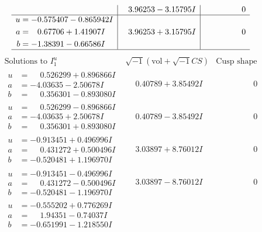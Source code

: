 \documentclass[1p]{elsarticle_modified}
\theoremstyle{definition}
\newcommand{\I}{\sqrt{-1}}
\begin{document}
$$\begin{array}{c|c|c}
 & \phantom{-}3.96253 - 3.15795 I & \phantom{-0.000000 } 0 \\ \hline\begin{aligned}
u &= -0.575407 - 0.865942 I \\
a &= \phantom{-}0.67706 + 1.41907 I \\
b &= -1.38391 - 0.66586 I\end{aligned}
 & \phantom{-}3.96253 + 3.15795 I & \phantom{-0.000000 } 0\\
 \hline 
 \end{array}$$\newpage$$\begin{array}{c|c|c}  
\text{Solutions to }I^u_{1}& \I (\text{vol} + \sqrt{-1}CS) & \text{Cusp shape}\\
 \hline 
\begin{aligned}
u &= \phantom{-}0.526299 + 0.896866 I \\
a &= -4.03635 - 2.50678 I \\
b &= \phantom{-}0.356301 - 0.893080 I\end{aligned}
 & \phantom{-}0.40789 + 3.85492 I & \phantom{-0.000000 } 0 \\ \hline\begin{aligned}
u &= \phantom{-}0.526299 - 0.896866 I \\
a &= -4.03635 + 2.50678 I \\
b &= \phantom{-}0.356301 + 0.893080 I\end{aligned}
 & \phantom{-}0.40789 - 3.85492 I & \phantom{-0.000000 } 0 \\ \hline\begin{aligned}
u &= -0.913451 + 0.496996 I \\
a &= \phantom{-}0.431272 + 0.500496 I \\
b &= -0.520481 + 1.196970 I\end{aligned}
 & \phantom{-}3.03897 + 8.76012 I & \phantom{-0.000000 } 0 \\ \hline\begin{aligned}
u &= -0.913451 - 0.496996 I \\
a &= \phantom{-}0.431272 - 0.500496 I \\
b &= -0.520481 - 1.196970 I\end{aligned}
 & \phantom{-}3.03897 - 8.76012 I & \phantom{-0.000000 } 0 \\ \hline\begin{aligned}
u &= -0.555202 + 0.776269 I \\
a &= \phantom{-}1.94351 - 0.74037 I \\
b &= -0.651991 - 1.218550 I\end{aligned}

\end{array}$$
\end{document}
